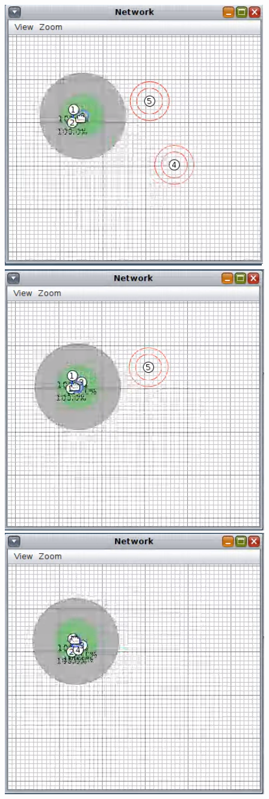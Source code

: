 \documentclass{article}
\begin{document}
\begin{center}
\includegraphics[scale=1]{img3.png}
\includegraphics[scale=1]{img4.png}
\includegraphics[scale=1]{img5.png}

\end{center}
\end{document}
